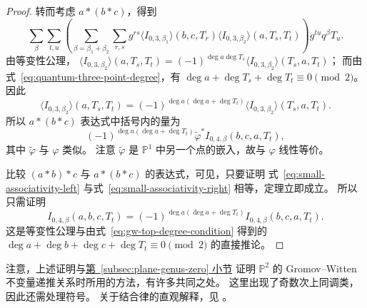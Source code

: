 \begin{proof}
转而考虑 $a*(b*c)$，得到
\[
\sum_\beta\sum_{t,u}\left(\sum_{\beta=\beta_1+\beta_2}\sum_{r,s}
g^{rs}\langle I_{0,3,\beta_1}\rangle(b,c,T_r)
\langle I_{0,3,\beta_2}\rangle(a,T_s,T_t)\right)g^{tu}q^\beta T_u.
\]
由等变性公理，
$\langle I_{0,3,\beta_2}\rangle(a,T_s,T_t)=
(-1)^{\deg a\deg T_s}\langle I_{0,3,\beta_2}\rangle(T_s,a,T_t)$；
而由式~\eqref{eq:quantum-three-point-degree}，有
$\deg a+\deg T_s+\deg T_t\equiv0\pmod2$。因此
\[
\langle I_{0,3,\beta_2}\rangle(a,T_s,T_t)
=(-1)^{\deg a(\deg a+\deg T_t)}\langle I_{0,3,\beta_2}\rangle(T_s,a,T_t).
\]
所以 $a*(b*c)$ 表达式中括号内的量为
\begin{equation}\label{eq:small-associativity-right}
(-1)^{\deg a(\deg a+\deg T_t)}\widetilde\varphi^*I_{0,4,\beta}(b,c,a,T_t),
\end{equation}
其中 $\widetilde\varphi$ 与 $\varphi$ 类似。
注意 $\widetilde\varphi$ 是 $\mathbb P^1$ 中另一个点的嵌入，故与 $\varphi$ 线性等价。

比较 $(a*b)*c$ 与 $a*(b*c)$ 的表达式，可见，只要证明
式~\eqref{eq:small-associativity-left} 与式~\eqref{eq:small-associativity-right} 相等，定理立即成立。
所以只需证明
\[
I_{0,4,\beta}(a,b,c,T_t)
=(-1)^{\deg a(\deg a+\deg T_t)}I_{0,4,\beta}(b,c,a,T_t).
\]
这是等变性公理与由式~\eqref{eq:gw-top-degree-condition} 得到的
$\deg a+\deg b+\deg c+\deg T_t\equiv0\pmod2$ 的直接推论。
\end{proof}
注意，上述证明与\hyperref[subsec:plane-genus-zero]{第~\ref*{subsec:plane-genus-zero} 小节}
证明 $\mathbb P^2$ 的 Gromov--Witten 不变量递推关系时所用的方法，有许多共同之处。
这里出现了奇数次上同调类，因此还需处理符号。
关于结合律的直观解释，见 。

